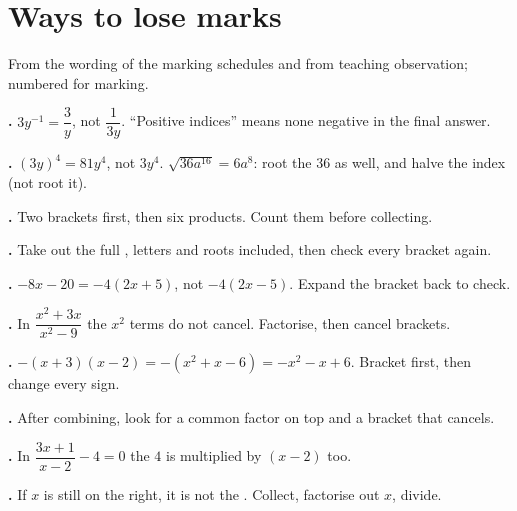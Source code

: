\documentclass[11pt]{article}
\begin{document}
\section{Ways to lose marks}\label{h:lose}
From the wording of the marking schedules and from teaching observation; numbered for marking.
\begin{description}[leftmargin=9mm, labelwidth=8mm, labelsep=1mm, font=\normalfont]
\item[\textbf{\Lref{negindex}}] \textbf{.} $3y^{-1} = \dfrac{3}{y}$, not $\dfrac{1}{3y}$. ``Positive indices'' means none negative in the final answer.
\item[\textbf{\Lref{coef}}] \textbf{.} $(3y)^{4} = 81y^{4}$, not $3y^{4}$. $\sqrt{36a^{16}} = 6a^{8}$: root the 36 as well, and halve the index (not root it).
\item[\textbf{\Lref{cubic}}] \textbf{.} Two brackets first, then six products. Count them before collecting.
\item[\textbf{\Lref{complete}}] \textbf{.} Take out the full \Thcf{}, letters and roots included, then check every bracket again.
\item[\textbf{\Lref{negfactor}}] \textbf{.} $-8x - 20 = -4(2x+5)$, not $-4(2x-5)$. Expand the bracket back to check.
\item[\textbf{\Lref{cancel}}] \textbf{.} In $\dfrac{x^{2}+3x}{x^{2}-9}$ the $x^{2}$ terms do not cancel. Factorise, then cancel brackets.
\item[\textbf{\Lref{minus}}] \textbf{.} $-(x+3)(x-2) = -(x^{2}+x-6) = -x^{2}-x+6$. Bracket first, then change every sign.
\item[\textbf{\Lref{simplest}}] \textbf{.} After combining, look for a common factor on top and a bracket that cancels.
\item[\textbf{\Lref{everyterm}}] \textbf{.} In $\dfrac{3x+1}{x-2} - 4 = 0$ the $4$ is multiplied by $(x-2)$ too.
\item[\textbf{\Lref{subject}}] \textbf{.} If $x$ is still on the right, it is not the \Tsubject{}. Collect, factorise out $x$, divide.
\end{description}

\end{document}
